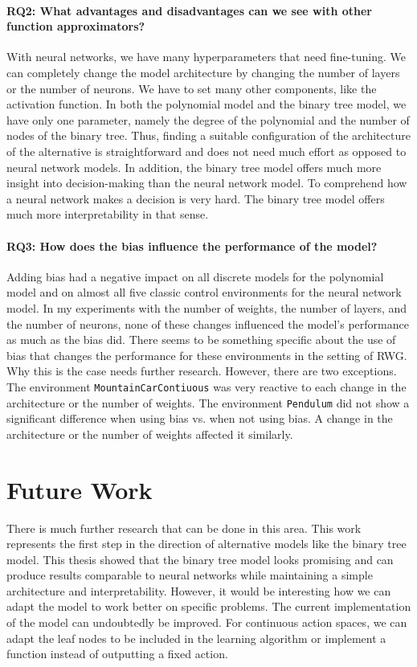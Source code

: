 \paragraph*{RQ2: What advantages and disadvantages can we see with other function approximators?} With neural networks, we have many hyperparameters that need fine-tuning. We can completely change the model architecture by changing the number of layers or the number of neurons. We have to set many other components, like the activation function. In both the polynomial model and the binary tree model, we have only one parameter, namely the degree of the polynomial and the number of nodes of the binary tree. Thus, finding a suitable configuration of the architecture of the alternative is straightforward and does not need much effort as opposed to neural network models. In addition, the binary tree model offers much more insight into decision-making than the neural network model. To comprehend how a neural network makes a decision is very hard. The binary tree model offers much more interpretability in that sense.

\paragraph{RQ3: How does the bias influence the performance of the model?} Adding bias had a negative impact on all discrete models for the polynomial model and on almost all five classic control environments for the neural network model. In my experiments with the number of weights, the number of layers, and the number of neurons, none of these changes influenced the model's performance as much as the bias did. There seems to be something specific about the use of bias that changes the performance for these environments in the setting of RWG. Why this is the case needs further research. However, there are two exceptions. The environment \verb|MountainCarContiuous| was very reactive to each change in the architecture or the number of weights. The environment \verb|Pendulum| did not show a significant difference when using bias vs. when not using bias. A change in the architecture or the number of weights affected it similarly.


\section{Future Work}
There is much further research that can be done in this area. This work represents the first step in the direction of alternative models like the binary tree model. This thesis showed that the binary tree model looks promising and can produce results comparable to neural networks while maintaining a simple architecture and interpretability. However, it would be interesting how we can adapt the model to work better on specific problems. The current implementation of the model can undoubtedly be improved. For continuous action spaces, we can adapt the leaf nodes to be included in the learning algorithm or implement a function instead of outputting a fixed action.

